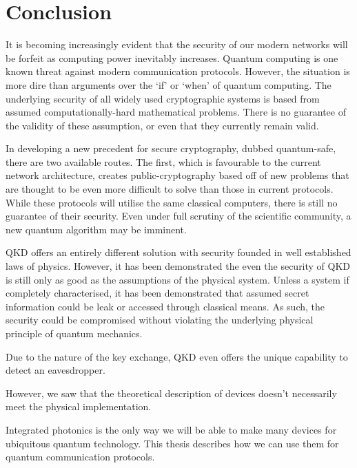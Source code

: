 %
%
\graphicspath{{./chapters/chapter07/fig07/}}

\let\textcircled=\pgftextcircled
\chapter{Conclusion}
\label{chap:conclusion}



It is becoming increasingly evident that the security of our modern networks will be forfeit as computing power inevitably increases. Quantum computing is one known threat against modern communication protocols. However, the situation is more dire than arguments over the `if' or `when' of quantum computing. The underlying security of all widely used cryptographic systems is based from assumed computationally-hard mathematical problems. There is no guarantee of the validity of these assumption, or even that they currently remain valid.

In developing a new precedent for secure cryptography, dubbed quantum-safe, there are two available routes. The first, which is favourable to the current network architecture, creates public-cryptography based off of new problems that are thought to be even more difficult to solve than those in current protocols. While these protocols will utilise the same classical computers, there is still no guarantee of their security. Even under full scrutiny of the scientific community, a new quantum algorithm may be imminent. 

\Ac{QKD} offers an entirely different solution with security founded in well established laws of physics. However, it has been demonstrated the even the security of \ac{QKD} is still only as good as the assumptions of the physical system. Unless a system if completely characterised, it has been demonstrated that assumed secret information could be leak or accessed through classical means. As such, the security could be compromised without violating the underlying physical principle of quantum mechanics.

Due to the nature of the key exchange, \ac{QKD} even offers the unique capability to detect an eavesdropper. 

However, we saw that the theoretical description of devices doesn't necessarily meet the physical implementation.

Integrated photonics is the only way we will be able to make many devices for ubiquitous quantum technology. This thesis describes how we can use them for quantum communication protocols. 

